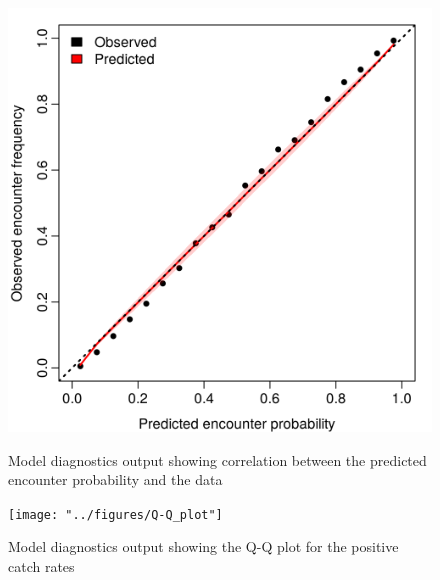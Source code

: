 \documentclass[12pt]{article}
\begin{document}
\begin{linenumbers}
\begin{figure}[!ht]
\begin{center}
	\includegraphics[width = 0.9\linewidth]{"../figures/Diag--Encounter_prob"}
	\label{fig:S12}
	\caption{Model diagnostics output showing correlation between the
		predicted encounter probability and the data}
	\end{center}
\end{figure}

\begin{figure}[!ht]
\begin{center}
	\texttt{[image: "../figures/Q-Q\_plot"]}
	\label{fig:S13}
	\caption{Model diagnostics output showing the Q-Q plot for the positive
	catch rates}
	\end{center}
\end{figure}


\end{linenumbers}
\end{document}
